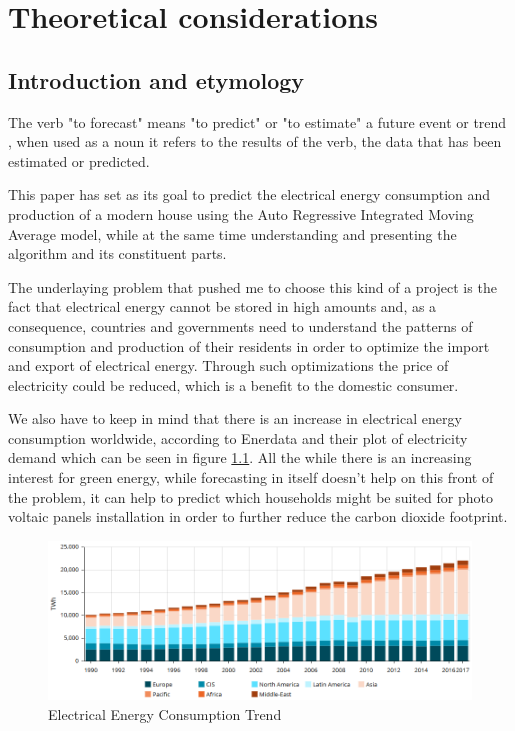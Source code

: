 \documentclass[12pt,a4paper,titlepage]{report}
\begin{document}
\newpage
\chapter{Theoretical considerations}
\section{Introduction and etymology}

The verb "to forecast" means "to predict" or "to estimate" a future event or trend \cite{oxfordForecast}, when used as a noun it refers to the results of the verb, the data that has been estimated or predicted.

This paper has set as its goal to predict the electrical energy consumption and production of a modern house using the Auto Regressive Integrated Moving Average model, while at the same time understanding and presenting the algorithm and its constituent parts.

The underlaying problem that pushed me to choose this kind of a project is the fact that electrical energy cannot be stored in high amounts and, as a consequence, countries and governments need to understand the patterns of consumption and production of their residents in order to optimize the import and export of electrical energy. Through such optimizations the price of electricity could be reduced, which is a benefit to the domestic consumer.

We also have to keep in mind that there is an increase in electrical energy consumption worldwide, according to Enerdata \cite{enerdata} and their plot of electricity demand which can be seen in figure \ref{energytrend}. All the while there is an increasing interest for green energy, while forecasting in itself doesn't help on this front of the problem, it can help to predict which households might be suited for photo voltaic panels installation in order to further reduce the carbon dioxide footprint. 

\begin{figure}[h]
    \centering
    \includegraphics[width=1\textwidth]{denergytrend}
    \caption{Electrical Energy Consumption Trend}
    \label{energytrend}
\end{figure}
\end{document}

